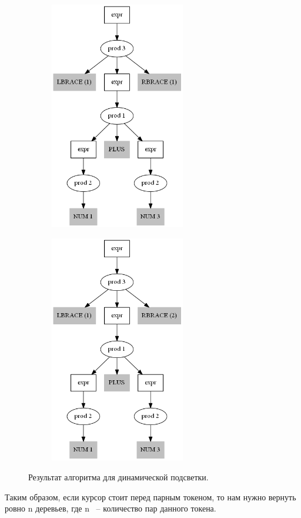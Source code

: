 \begin{figure}[h]
    \centering
    \begin{subfigure}[h]{0.25\textwidth}
        \includegraphics[height=100mm]{Pictures/Dynamic_DynamicRes1.png}
    \end{subfigure}
    \qquad \qquad
    \begin{subfigure}[h]{0.25\textwidth}
        \includegraphics[height=100mm]{Pictures/Dynamic_DynamicRes2.png}
    \end{subfigure}
    \caption{Результат алгоритма для динамической подсветки.}
    \label{dynamicRes}
\end{figure}

Таким образом, если курсор стоит перед парным токеном, то нам нужно вернуть ровно n деревьев, где n ~-- количество пар данного токена. 

